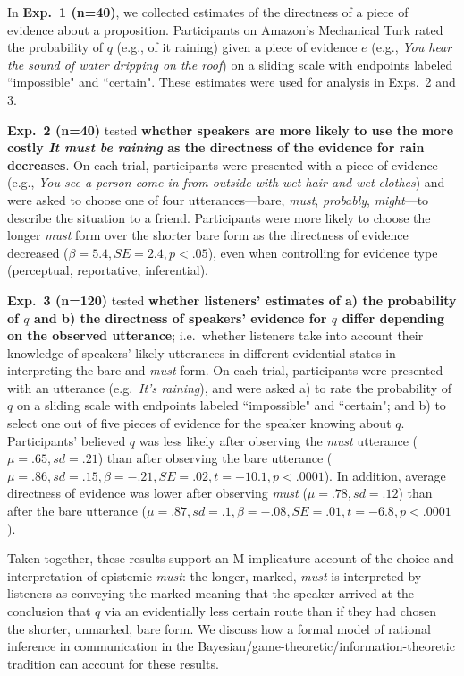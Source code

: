 \documentclass[11pt]{article}
\begin{document}
In \textbf{Exp.~1 (n=40)}, we collected estimates of the directness of a piece of evidence about a proposition. Participants on Amazon's Mechanical Turk rated the probability of $q$ (e.g., of it raining) given a piece of evidence $e$ (e.g., \textit{You hear the sound of water dripping on the roof}) on a sliding scale with endpoints labeled ``impossible" and ``certain". These estimates were used for analysis in Exps.~2 and 3.

\textbf{Exp.~2 (n=40)} tested \textbf{whether speakers are more likely to use the more costly \textit{It must be raining} as the directness of the evidence for rain decreases}. On each trial, participants were presented with a piece of evidence (e.g., \textit{You see a person come in from outside with wet hair and wet clothes}) and were asked to choose one of four utterances---bare, \textit{must}, \textit{probably}, \textit{might}---to describe the situation to a friend. Participants were more likely to choose the longer \textit{must} form over the shorter bare form as the directness of evidence decreased ($\beta=5.4, SE=2.4, p<.05$), even when controlling for evidence type (perceptual, reportative, inferential).

\textbf{Exp.~3 (n=120)} tested \textbf{whether listeners' estimates of a) the probability of $q$ and b) the directness of speakers' evidence for $q$ differ depending on the observed utterance}; i.e.~whether listeners take into account their knowledge of speakers' likely utterances in different evidential states in interpreting the bare and \textit{must} form. On each trial, participants were presented with an utterance (e.g.~\textit{It's raining}), and were asked a) to rate the probability of $q$ on a sliding scale with endpoints labeled ``impossible" and ``certain"; and b) to select one out of five  pieces of evidence for the speaker knowing about $q$. Participants' believed $q$ was less likely after observing the \textit{must} utterance ($\mu=.65,sd=.21$) than after observing the bare utterance ($\mu=.86,sd=.15, \beta=-.21, SE=.02, t=-10.1, p<.0001$). In addition, average directness of evidence was lower after observing \textit{must} ($\mu=.78,sd=.12$) than after the bare utterance ($\mu=.87,sd=.1, \beta=-.08, SE=.01, t=-6.8, p<.0001$).

Taken together, these results support an M-implicature account of the choice and interpretation of epistemic \textit{must}: the longer, marked, \textit{must} is interpreted by listeners as conveying the marked meaning that the speaker arrived at the conclusion that $q$ via an evidentially less certain route than if they had chosen the shorter, unmarked, bare form. We discuss how a formal model of rational inference in communication in the Bayesian/game-theoretic/information-theoretic tradition \cite{franke, goodman, levy, jaeger} can account for these results.
\end{document}
